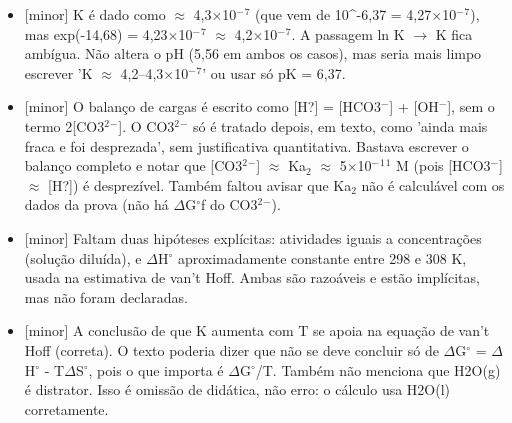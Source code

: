 \documentclass{article}%
\begin{document}
\begin{itemize}%
\item%
{[}minor{]} K é dado como $\approx$ 4,3$\times$10$^{-}$$^{7}$ (que vem de 10\^{}-6,37 = 4,27$\times$10$^{-}$$^{7}$), mas exp(-14,68) = 4,23$\times$10$^{-}$$^{7}$ $\approx$ 4,2$\times$10$^{-}$$^{7}$. A passagem ln K $\to$ K fica ambígua. Não altera o pH (5,56 em ambos os casos), mas seria mais limpo escrever 'K $\approx$ 4,2--4,3$\times$10$^{-}$$^{7}$' ou usar só pK = 6,37.%
\item%
{[}minor{]} O balanço de cargas é escrito como {[}H?{]} = {[}HCO3$^{-}${]} + {[}OH$^{-}${]}, sem o termo 2{[}CO3$^2$$^{-}${]}. O CO3$^2$$^{-}$ só é tratado depois, em texto, como 'ainda mais fraca e foi desprezada', sem justificativa quantitativa. Bastava escrever o balanço completo e notar que {[}CO3$^2$$^{-}${]} $\approx$ Ka$_{2}$ $\approx$ 5$\times$10$^{-}$$^{1}$$^{1}$ M (pois {[}HCO3$^{-}${]} $\approx$ {[}H?{]}) é desprezível. Também faltou avisar que Ka$_{2}$ não é calculável com os dados da prova (não há $\Delta$G$^\circ$f do CO3$^2$$^{-}$).%
\item%
{[}minor{]} Faltam duas hipóteses explícitas: atividades iguais a concentrações (solução diluída), e $\Delta$H$^\circ$ aproximadamente constante entre 298 e 308 K, usada na estimativa de van't Hoff. Ambas são razoáveis e estão implícitas, mas não foram declaradas.%
\item%
{[}minor{]} A conclusão de que K aumenta com T se apoia na equação de van't Hoff (correta). O texto poderia dizer que não se deve concluir só de $\Delta$G$^\circ$ = $\Delta$H$^\circ$ - T$\Delta$S$^\circ$, pois o que importa é $\Delta$G$^\circ$/T. Também não menciona que H2O(g) é distrator. Isso é omissão de didática, não erro: o cálculo usa H2O(l) corretamente.%
\end{itemize}%
\end{document}
